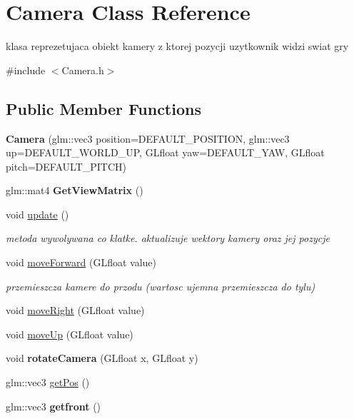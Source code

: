\hypertarget{class_camera}{}\section{Camera Class Reference}
\label{class_camera}


klasa reprezetujaca obiekt kamery z ktorej pozycji uzytkownik widzi swiat gry  




{\ttfamily \#include $<$Camera.\+h$>$}

\subsection*{Public Member Functions}
\begin{DoxyCompactItemize}
\item 
\mbox{\label{class_camera_ad81c45f1ffb7af4fc5e9299721ebfcf7}} 
{\bfseries Camera} (glm\+::vec3 position=D\+E\+F\+A\+U\+L\+T\+\_\+\+P\+O\+S\+I\+T\+I\+ON, glm\+::vec3 up=D\+E\+F\+A\+U\+L\+T\+\_\+\+W\+O\+R\+L\+D\+\_\+\+UP, G\+Lfloat yaw=D\+E\+F\+A\+U\+L\+T\+\_\+\+Y\+AW, G\+Lfloat pitch=D\+E\+F\+A\+U\+L\+T\+\_\+\+P\+I\+T\+CH)
\item 
\mbox{\label{class_camera_affa333055635aed96518c4c66be9a70c}} 
glm\+::mat4 {\bfseries Get\+View\+Matrix} ()
\item 
void \hyperlink{class_camera_a42cda7239981a5618660d04bd5893556}{update} ()
\begin{DoxyCompactList}\small\item\em metoda wywolywana co klatke. aktualizuje wektory kamery oraz jej pozycje \end{DoxyCompactList}\item 
void \hyperlink{class_camera_a79693c3d7c085b0252216f8348b525ce}{move\+Forward} (G\+Lfloat value)
\begin{DoxyCompactList}\small\item\em przemieszcza kamere do przodu (wartosc ujemna przemieszcza do tylu) \end{DoxyCompactList}\item 
void \hyperlink{class_camera_ac0f82a424f190cc4f65e5f485d2317d2}{move\+Right} (G\+Lfloat value)
\item 
void \hyperlink{class_camera_a945b9054e8f7f840d29bff164cf57f65}{move\+Up} (G\+Lfloat value)
\item 
\mbox{\label{class_camera_aad3c6e5fa354cd87ee7404092f21cc66}} 
void {\bfseries rotate\+Camera} (G\+Lfloat x, G\+Lfloat y)
\item 
glm\+::vec3 \hyperlink{class_camera_ab40fb75b3d34a86d92fff61bb1675097}{get\+Pos} ()
\item 
\mbox{\label{class_camera_a3da785a7091a11554a63b7ef387ee317}} 
glm\+::vec3 {\bfseries getfront} ()
\end{DoxyCompactItemize}


